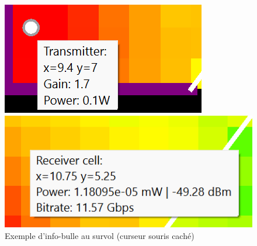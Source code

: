 
\begin{figure}[H]
  \centering
  \begin{minipage}{0.4\textwidth}
    \includegraphics[width=\textwidth]{latex/images/tooltip.png}
  \end{minipage}
  \hfill
  \begin{minipage}{0.49\textwidth}
    \includegraphics[width=\textwidth]{latex/images/tooltip2.png}
  \end{minipage}
  \caption{Exemple d'info-bulle au survol (curseur souris caché)}
  \label{fig:tooltips}
\end{figure}

